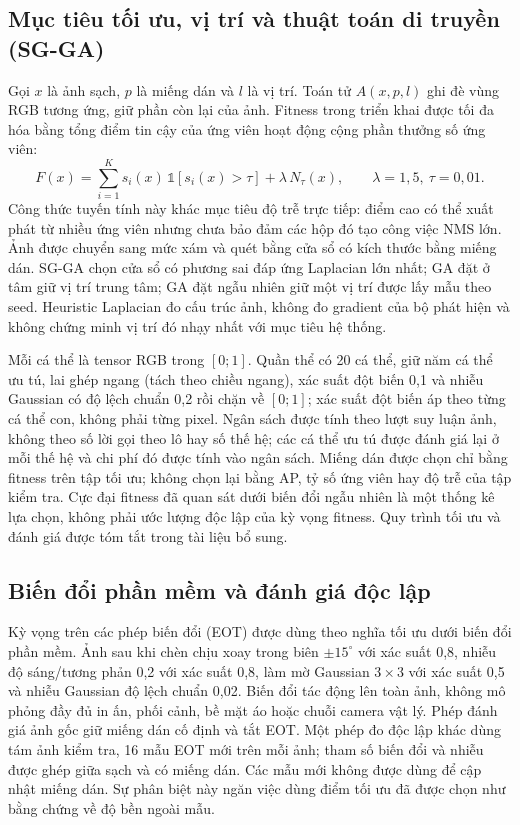\documentclass[12pt,a4paper]{article}
\newcommand{\Ntau}{N_{\tau}}
\begin{document}
\subsection{Mục tiêu tối ưu, vị trí và thuật toán di truyền (SG-GA)}
Gọi $x$ là ảnh sạch, $p$ là miếng dán và $l$ là vị trí. Toán tử $A(x,p,l)$ ghi đè vùng RGB tương ứng, giữ phần còn lại của ảnh. Fitness trong triển khai được tối đa hóa bằng tổng điểm tin cậy của ứng viên hoạt động cộng phần thưởng số ứng viên:
\begin{equation}
F(x)=\sum_{i=1}^{K} s_i(x)\,\mathbb{1}[s_i(x)>\tau]+\lambda\,\Ntau(x),\qquad \lambda=1{,}5,\ \tau=0{,}01 .
\end{equation}
Công thức tuyến tính này khác mục tiêu độ trễ trực tiếp: điểm cao có thể xuất phát từ nhiều ứng viên nhưng chưa bảo đảm các hộp đó tạo công việc NMS lớn. Ảnh được chuyển sang mức xám và quét bằng cửa sổ có kích thước bằng miếng dán. SG-GA chọn cửa sổ có phương sai đáp ứng Laplacian lớn nhất; GA đặt ở tâm giữ vị trí trung tâm; GA đặt ngẫu nhiên giữ một vị trí được lấy mẫu theo seed. Heuristic Laplacian đo cấu trúc ảnh, không đo gradient của bộ phát hiện và không chứng minh vị trí đó nhạy nhất với mục tiêu hệ thống.

Mỗi cá thể là tensor RGB trong $[0;1]$. Quần thể có 20 cá thể, giữ năm cá thể ưu tú, lai ghép ngang (tách theo chiều ngang), xác suất đột biến 0,1 và nhiễu Gaussian có độ lệch chuẩn 0,2 rồi chặn về $[0;1]$; xác suất đột biến áp theo từng cá thể con, không phải từng pixel. Ngân sách được tính theo lượt suy luận ảnh, không theo số lời gọi theo lô hay số thế hệ; các cá thể ưu tú được đánh giá lại ở mỗi thế hệ và chi phí đó được tính vào ngân sách. Miếng dán được chọn chỉ bằng fitness trên tập tối ưu; không chọn lại bằng AP, tỷ số ứng viên hay độ trễ của tập kiểm tra. Cực đại fitness đã quan sát dưới biến đổi ngẫu nhiên là một thống kê lựa chọn, không phải ước lượng độc lập của kỳ vọng fitness. Quy trình tối ưu và đánh giá được tóm tắt trong tài liệu bổ sung.



\subsection{Biến đổi phần mềm và đánh giá độc lập}
Kỳ vọng trên các phép biến đổi (EOT) được dùng theo nghĩa tối ưu dưới biến đổi phần mềm. Ảnh sau khi chèn chịu xoay trong biên $\pm15^{\circ}$ với xác suất 0,8, nhiễu độ sáng/tương phản 0,2 với xác suất 0,8, làm mờ Gaussian $3\times3$ với xác suất 0,5 và nhiễu Gaussian độ lệch chuẩn 0,02. Biến đổi tác động lên toàn ảnh, không mô phỏng đầy đủ in ấn, phối cảnh, bề mặt áo hoặc chuỗi camera vật lý. Phép đánh giá ảnh gốc giữ miếng dán cố định và tắt EOT. Một phép đo độc lập khác dùng tám ảnh kiểm tra, 16 mẫu EOT mới trên mỗi ảnh; tham số biến đổi và nhiễu được ghép giữa sạch và có miếng dán. Các mẫu mới không được dùng để cập nhật miếng dán. Sự phân biệt này ngăn việc dùng điểm tối ưu đã được chọn như bằng chứng về độ bền ngoài mẫu.
\end{document}
